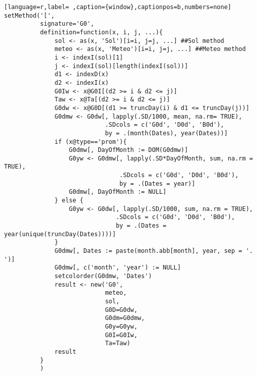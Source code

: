 \begin{lstlisting}[language=r,label= ,caption={window},captionpos=b,numbers=none]
setMethod('[',
          signature='G0',
          definition=function(x, i, j, ...){
              sol <- as(x, 'Sol')[i=i, j=j, ...] ##Sol method
              meteo <- as(x, 'Meteo')[i=i, j=j, ...] ##Meteo method
              i <- indexI(sol)[1]
              j <- indexI(sol)[length(indexI(sol))]
              d1 <- indexD(x)
              d2 <- indexI(x)
              G0Iw <- x@G0I[(d2 >= i & d2 <= j)]
              Taw <- x@Ta[(d2 >= i & d2 <= j)]
              G0dw <- x@G0D[(d1 >= truncDay(i) & d1 <= truncDay(j))]
              G0dmw <- G0dw[, lapply(.SD/1000, mean, na.rm= TRUE),
                            .SDcols = c('G0d', 'D0d', 'B0d'),
                            by = .(month(Dates), year(Dates))]
              if (x@type=='prom'){
                  G0dmw[, DayOfMonth := DOM(G0dmw)]
                  G0yw <- G0dmw[, lapply(.SD*DayOfMonth, sum, na.rm = TRUE),
                                .SDcols = c('G0d', 'D0d', 'B0d'),
                                by = .(Dates = year)]
                  G0dmw[, DayOfMonth := NULL]
              } else {
                  G0yw <- G0dw[, lapply(.SD/1000, sum, na.rm = TRUE),
                               .SDcols = c('G0d', 'D0d', 'B0d'),
                               by = .(Dates = year(unique(truncDay(Dates))))]
              }
              G0dmw[, Dates := paste(month.abb[month], year, sep = '. ')]
              G0dmw[, c('month', 'year') := NULL]
              setcolorder(G0dmw, 'Dates')
              result <- new('G0',
                            meteo,
                            sol,
                            G0D=G0dw,
                            G0dm=G0dmw,
                            G0y=G0yw,
                            G0I=G0Iw,
                            Ta=Taw)
              result
          }
          )



\end{lstlisting}
